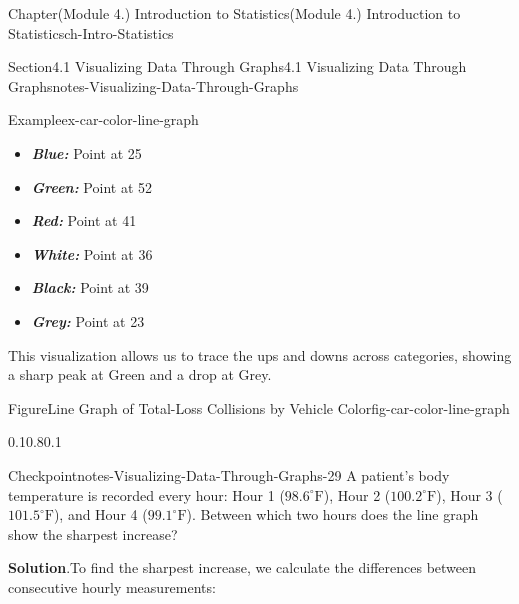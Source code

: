 \documentclass[oneside,10pt,]{book}
\newcommand{\blocktitlefont}{\relax}
\newcommand{\ptxlistdisc}{\raisebox{0.3ex}{\textbullet}}
\newcommand{\alert}[1]{\textbf{\textit{#1}}}
\begin{document}
\begin{chapterptx}{Chapter}{(Module 4.) Introduction to Statistics}{}{(Module 4.) Introduction to Statistics}{}{}{ch-Intro-Statistics}
\begin{sectionptx}{Section}{4.1 Visualizing Data Through Graphs}{}{4.1 Visualizing Data Through Graphs}{}{}{notes-Visualizing-Data-Through-Graphs}
\begin{example}{Example}{}{ex-car-color-line-graph}
\par
%
\begin{itemize}[label=\ptxlistdisc]
\item{}\alert{Blue:} Point at 25%
\item{}\alert{Green:} Point at 52%
\item{}\alert{Red:} Point at 41%
\item{}\alert{White:} Point at 36%
\item{}\alert{Black:} Point at 39%
\item{}\alert{Grey:} Point at 23%
\end{itemize}
%
\par
This visualization allows us to trace the ups and downs across categories, showing a sharp peak at Green and a drop at Grey.%
\begin{figureptx}{Figure}{Line Graph of Total-Loss Collisions by Vehicle Color}{fig-car-color-line-graph}{}%
\begin{image}{0.1}{0.8}{0.1}{}%
%
\end{image}%
\tcblower
\end{figureptx}%
\end{example}
\begin{inlineexercise}{Checkpoint}{}{notes-Visualizing-Data-Through-Graphs-29}%
A patient's body temperature is recorded every hour: Hour 1 (\(98.6^\circ\text{F}\)), Hour 2 (\(100.2^\circ\text{F}\)), Hour 3 (\(101.5^\circ\text{F}\)), and Hour 4 (\(99.1^\circ\text{F}\)). Between which two hours does the line graph show the sharpest increase?%
\par\smallskip%
\noindent\textbf{\blocktitlefont Solution}.\hypertarget{notes-Visualizing-Data-Through-Graphs-29-2}{}\quad{}To find the sharpest increase, we calculate the differences between consecutive hourly measurements:%
\par

\end{inlineexercise}
\end{sectionptx}
\end{chapterptx}
\end{document}
